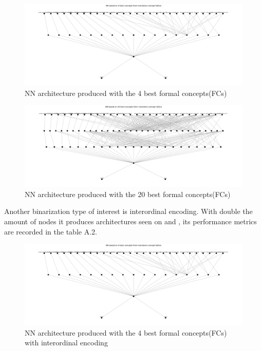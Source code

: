 \documentclass[14pt,a4paper]{extarticle}
\begin{document}
	\begin{figure}[h]
		\centering
		\includegraphics[width=\textwidth]{media/employees/NN_architecture_4concepts.png}
		\caption{NN architecture produced with the 4 best formal concepts(FCs)}
		\label{fig:4concepts}
	\end{figure}
	
	\newpage
	
	\begin{figure}[h]
		\centering
		\includegraphics[width=\textwidth]{media/employees/NN_architecture_20concepts.png}
		\caption{NN architecture produced with the 20 best formal concepts(FCs)}
		\label{fig:20concepts}
	\end{figure}
	
	Another binarization type of interest is interordinal encoding. With double the amount of nodes it produces architectures seen on  and , its performance metrics are recorded in the table A.2. 
	
	\begin{figure}[h]
		\centering
		\includegraphics[width=\textwidth]{media/employees/NN_architecture_4concepts.png}
		\caption{NN architecture produced with the 4 best formal concepts(FCs) with interordinal encoding}
		\label{fig:4concepts-inter}
	\end{figure}
	
\end{document}
